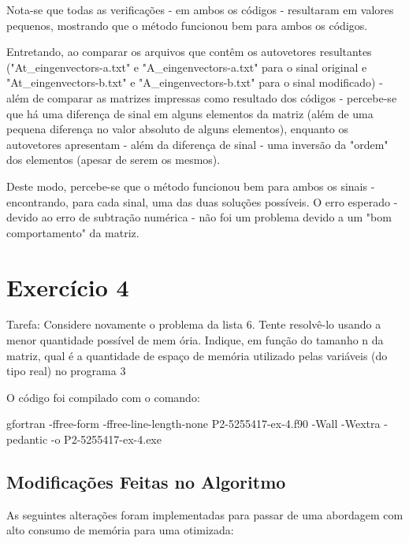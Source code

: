 \documentclass[12pt, a4paper]{article} %
\begin{document}
        Nota-se que todas as verifica\c{c}\~oes - em ambos os c\'odigos - resultaram em valores pequenos, mostrando que o m\'etodo funcionou bem para ambos os c\'odigos.
            
        Entretando, ao comparar os arquivos que cont\^em os autovetores resultantes ("At\_eingenvectors-a.txt" e "A\_eingenvectors-a.txt" para o sinal original e "At\_eingenvectors-b.txt" e "A\_eingenvectors-b.txt" para o sinal modificado) - al\'em de comparar as matrizes impressas como resultado dos c\'odigos -  percebe-se que há uma diferen\c{c}a de sinal em alguns elementos da matriz (al\'em de uma pequena diferen\c{c}a no valor absoluto de alguns elementos), enquanto os autovetores apresentam - al\'em da diferen\c{c}a de sinal - uma invers\~ao da "ordem" dos elementos (apesar de serem os mesmos).
        
        Deste modo, percebe-se que o m\'etodo funcionou bem para ambos os sinais - encontrando, para cada sinal, uma das duas solu\c{c}\~oes poss\'iveis. O erro esperado - devido ao erro de subtra\c{c}\~ao num\'erica - n\~ao foi um problema devido a um "bom comportamento" da matriz.

    \section{Exerc\'icio 4}

        Tarefa: Considere novamente o problema da lista 6. Tente resolv\^e-lo usando a menor quantidade poss\'ivel de mem \'oria. Indique, em fun\c{c}\~ao do tamanho n da matriz, qual \'e a quantidade de espa\c{c}o de mem\'oria utilizado pelas vari\'aveis (do tipo real) no programa 3

        O c\'odigo foi compilado com o comando:

    gfortran -ffree-form -ffree-line-length-none P2-5255417-ex-4.f90 -Wall -Wextra -pedantic -o P2-5255417-ex-4.exe

        \subsection*{Modifica\c{c}\~oes Feitas no Algoritmo}

        As seguintes altera\c{c}\~oes foram implementadas para passar de uma abordagem com alto consumo de mem\'oria para uma otimizada:
\end{document}
